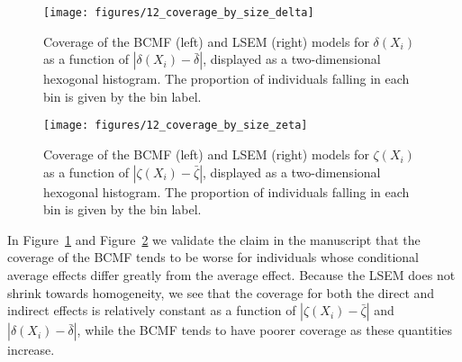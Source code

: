 \documentclass[12pt]{article}
\theoremstyle{remark}
\theoremstyle{definition}
\begin{document}
\begin{figure}
  \centering
  \texttt{[image: figures/12\_coverage\_by\_size\_delta]}
  \caption{Coverage of the BCMF (left) and LSEM (right) models for $\delta(X_i)$ as a function of $|\delta(X_i) - \bar \delta|$, displayed as a two-dimensional hexogonal histogram. The proportion of individuals falling in each bin is given by the bin label.}
  \label{fig:coverage_by_size_delta}
\end{figure}

\begin{figure}
  \centering
  \texttt{[image: figures/12\_coverage\_by\_size\_zeta]}
  \caption{Coverage of the BCMF (left) and LSEM (right) models for $\zeta(X_i)$ as a function of $|\zeta(X_i) - \bar \zeta|$, displayed as a two-dimensional hexogonal histogram. The proportion of individuals falling in each bin is given by the bin label.}
  \label{fig:coverage_by_size_zeta}
\end{figure}

In Figure~\ref{fig:coverage_by_size_delta} and Figure~\ref{fig:coverage_by_size_zeta} we validate the claim in the manuscript that the coverage of the BCMF tends to be worse for individuals whose conditional average effects differ greatly from the average effect. Because the LSEM does not shrink towards homogeneity, we see that the coverage for both the direct and indirect effects is relatively constant as a function of $|\zeta(X_i) - \bar \zeta|$ and $|\delta(X_i) - \bar \delta|$, while the BCMF tends to have poorer coverage as these quantities increase.



\end{document}
